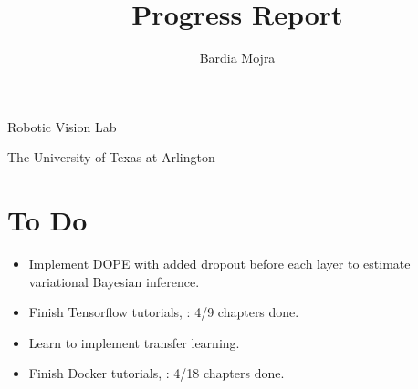 \documentclass[11pt]{article}
\title{Progress Report}
\author{Bardia Mojra}
\begin{document}
\maketitle
\thispagestyle{empty}

\bigskip
\bigskip
\begin{center}
	Robotic Vision Lab
\end{center}

\begin{center}
	The University of Texas at Arlington
\end{center}

\newpage

\section{To Do}
\begin{itemize}
	\item Implement DOPE with added dropout before each layer to estimate
	      variational  Bayesian inference.
	\item Finish Tensorflow tutorials, \cite{CVTF2}: 4/9 chapters done.
	\item Learn to implement transfer learning.
	\item Finish Docker tutorials, \cite{schenker2020learn}: 4/18 chapters done.
\end{itemize}
\end{document}
